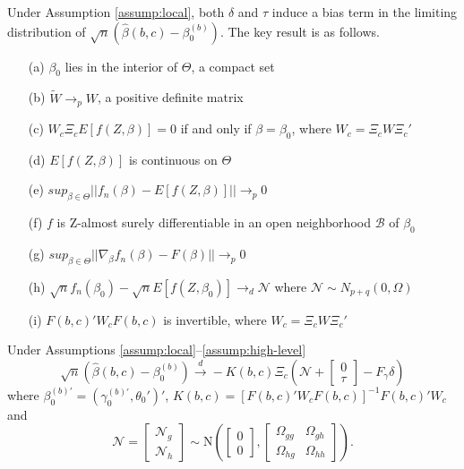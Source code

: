 Under Assumption \ref{assump:local}, both $\delta$ and $\tau$ induce a bias term in the limiting distribution of $\sqrt{n}\left(\widehat{\beta}(b,c) - \beta_0^{(b)}\right)$. 
The key result is as follows.
\begin{assump}
  \label{assump:high-level}
    \mbox{}
\begin{itemize}
\item[(a)] $\beta_0$ lies in the interior of $\Theta$, a compact set
\item[(b)] $\widetilde{W} \rightarrow_{p} W$, a positive definite matrix
\item[(c)] $W_c \Xi_c E[f(Z, \beta)] = 0$ if and only if $\beta = \beta_0$, where $W_c = \Xi_c W \Xi_c'$
\item[(d)] $E[f(Z,\beta)]$ is continuous on $\Theta$
\item[(e)] $sup_{\beta\in \Theta} ||f_n(\beta) - E[f(Z,\beta)]||\rightarrow_p 0$
\item[(f)] $f$ is Z-almost surely differentiable in an open neighborhood $\mathcal{B}$ of $\beta_0$
\item[(g)] $sup_{\beta \in \Theta} ||\nabla_{\beta} f_n(\beta) - F(\beta)|| \rightarrow_p 0 $
\item[(h)] $\sqrt{n}f_n(\beta_0) - \sqrt{n}E[f(Z,\beta_0)] \rightarrow_d \mathscr{N}$ where $\mathscr{N} \sim N_{p+q}(0,\Omega)$
\item[(i)] $F(b,c)' W_c F(b,c)$ is invertible, where $W_c = \Xi_c W \Xi_c'$
\end{itemize}
\end{assump}
\begin{thm}
\label{thm:asymp}
Under Assumptions \ref{assump:local}--\ref{assump:high-level}
		\begin{equation}
		\sqrt{n}\left(\widehat{\beta}(b,c) - \beta_0^{(b)}\right) \overset{d}{\rightarrow} - K(b,c)\Xi_c \left(\mathscr{N}+ \left[ \begin{array}{c} 0\\ \tau\end{array}\right] - F_\gamma\delta\right)
	\end{equation}
where $\beta_0^{(b)'} = (\gamma_0^{(b)'}, \theta_0')'$, $K(b,c) = \left[F(b,c)'W_c F(b,c)\right]^{-1} F(b,c)' W_c$
and
	\begin{equation}
		\mathscr{N} = \left[\begin{array}{c} \mathscr{N}_g\\  \mathscr{N}_h\end{array}\right]\sim \mbox{N}\left(\left[\begin{array}{c} 0\\ 0\end{array}\right] , \left[ \begin{array}{cc}\Omega_{gg} & \Omega_{gh}\\ \Omega_{hg}& \Omega_{hh} \end{array} \right]\right).
	\end{equation}
\end{thm}	
